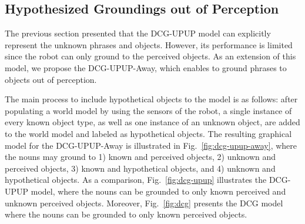
\subsection{Hypothesized Groundings out of Perception}
The previous section presented that the DCG-UPUP model can explicitly represent the unknown phrases and objects. However, its performance is limited since the robot can only ground to the perceived objects. As an extension of this model, we propose the DCG-UPUP-Away, which enables to ground phrases to objects out of perception.

The main process to include hypothetical objects to the model is as follows: after populating a world model by using the sensors of the robot, a single instance of every known object type, as well as one instance of an unknown object, are added to the world model and labeled as hypothetical objects. The resulting graphical model for the DCG-UPUP-Away is illustrated in Fig.~\ref{fig:dcg-upup-away}, where the nouns may ground to 1) known and perceived objects, 2) unknown and perceived objects, 3) known and hypothetical objects, and 4) unknown and hypothetical objects. As a comparison, Fig.~\ref{fig:dcg-upup} illustrates the DCG-UPUP model, where the nouns can be grounded to only known perceived and unknown perceived objects. Moreover, Fig.~\ref{fig:dcg} presents the DCG model where the nouns can be grounded to only known perceived objects.

